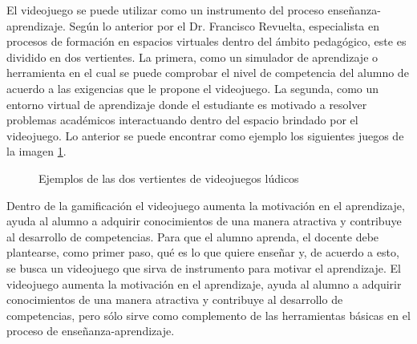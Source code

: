El videojuego se puede utilizar como un instrumento del proceso enseñanza-aprendizaje. Según lo anterior por el Dr. Francisco Revuelta, especialista en procesos de formación en espacios virtuales dentro del ámbito pedagógico, este es dividido en dos vertientes. La primera, como un simulador de aprendizaje o herramienta en el cual se puede comprobar el nivel de competencia del alumno de acuerdo a las exigencias que le propone el videojuego. La segunda, como un entorno virtual de aprendizaje donde el estudiante es motivado a resolver problemas académicos interactuando dentro del espacio brindado por el videojuego\cite{vid06}. Lo anterior se puede encontrar como ejemplo los siguientes juegos de la imagen \ref{fig:vidLud}.
\\[1pt]
\begin{figure}
	\centering
	\caption{Ejemplos de las dos vertientes de videojuegos lúdicos}
	\label{fig:vidLud}
\end{figure}

Dentro de la gamificación el videojuego aumenta la motivación en el aprendizaje, ayuda al alumno a adquirir conocimientos de una manera atractiva y contribuye al desarrollo de competencias. Para que el alumno aprenda, el docente debe plantearse, como primer paso, qué es lo que quiere enseñar y, de acuerdo a esto, se busca un videojuego que sirva de instrumento para motivar el aprendizaje. El videojuego aumenta la motivación en el aprendizaje, ayuda al alumno a adquirir conocimientos de una manera atractiva y contribuye al desarrollo de competencias, pero sólo sirve como complemento de las herramientas básicas en el proceso de enseñanza-aprendizaje.
\\[1pt]

